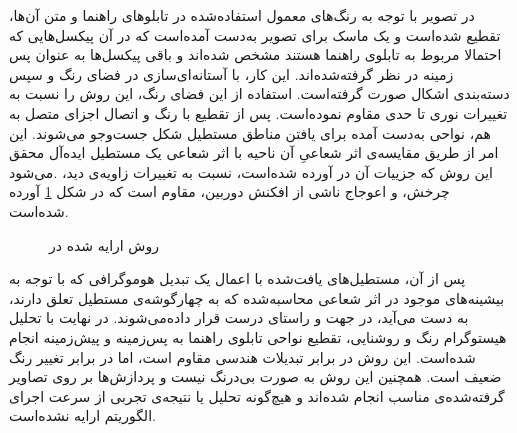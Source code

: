 \documentclass[12pt,a4paper]{article}
\theoremstyle{definition}
\theoremstyle{theorem}
\theoremstyle{definition}
\begin{document}
 در \cite{adaptive} تصویر با توجه به رنگ‌های معمول استفاده‌شده در تابلوهای راهنما و متن‌ آن‌ها، تقطیع شده‌است و یک ماسک برای تصویر به‌دست‌ آمده‌است که در آن پیکسل‌هایی که احتمالا مربوط به تابلوی راهنما هستند مشخص شده‌اند و باقی پیکسل‌ها به عنوان پس زمینه در نظر گرفته‌‌شده‌اند. این کار، با آستانه‌‌ای‌سازی در فضای رنگ  و سپس دسته‌بندی اشکال صورت گرفته‌است. استفاده از این فضای رنگ، این روش را نسبت به تغییرات نوری تا حدی مقاوم نموده‌است. پس از تقطیع با رنگ و اتصال اجزای متصل به‌ هم، نواحی به‌دست آمده برای یافتن مناطق مستطیل شکل جست‌وجو می‌شوند. این امر از طریق مقایسه‌ی اثر شعاعیِ   آن ناحیه با اثر شعاعی  یک مستطیل ایده‌آل محقق می‌شود‎. این روش که جزییات آن در \cite{FFT} آورده‌ شده‌است، نسبت به تغییرات زاویه‌ی دید، چرخش، و اعوجاج ناشی از افکنش دوربین، مقاوم است که در شکل \ref{fft-pic} آورده شده‌است. 
 \begin{figure}[t]
\centering
{}
\caption{روش ارایه شده در \cite{adaptive}}
\label{fft-pic}
\end{figure}
 
 پس از آن، مستطیل‌های یافت‌شده با اعمال یک تبدیل هوموگرافی که با توجه به بیشینه‌های موجود در اثر شعاعی محاسبه‌شده که به چهارگوشه‌ی مستطیل تعلق دارند، به دست می‌آید،  در جهت و راستای درست قرار داده‌می‌شوند.  در نهایت با تحلیل هیستوگرام رنگ و روشنایی، تقطیع نواحی تابلوی راهنما به پس‌زمینه و پیش‌زمینه انجام شده‌است. این روش در برابر تبدیلات هندسی مقاوم است، اما در برابر تغییر رنگ ضعیف است. همچنین این روش به صورت بی‌درنگ نیست و پردازش‌ها بر روی تصاویر گرفته‌شده‌ی مناسب انجام شده‌اند و هیچ‌گونه تحلیل یا نتیجه‌ی تجربی از سرعت اجرای الگوریتم ارایه نشده‌است.
\end{document}
